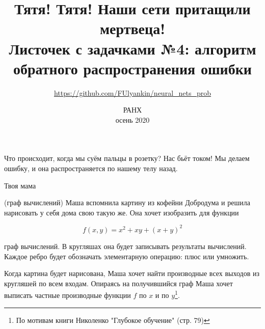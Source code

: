 \documentclass[12pt, a4paper, oneside]{article}
\title{%
	Тятя! Тятя! Наши сети притащили мертвеца! \\
	\large Листочек с задачками №4: алгоритм обратного распространения ошибки
}
\date{РАНХ \\ осень 2020}
\author{\url{https://github.com/FUlyankin/neural_nets_prob} }
\theoremstyle{plain} %
\theoremstyle{definition}
\begin{document}
	
	\maketitle


\epigraph{Что происходит, когда мы суём пальцы в розетку? Нас бьёт током! Мы делаем ошибку, и она распространяется по нашему телу назад.}{Твоя мама}


\begin{problem}{(граф вычислений)}
	Маша вспомнила картину из кофейни Добродума и решила нарисовать у себя дома свою такую же. Она хочет изобразить для функции  
	
	$$
	f(x,y) = x^2 + xy + (x + y)^2
	$$ 
	
	граф вычислений. В кругляшах она будет записывать результаты вычислений. Каждое ребро будет обозначать элементарную операцию: плюс или умножить.
	
	Когда картина будет нарисована, Маша хочет найти производные всех выходов из кругляшей по всем входам. Опираясь на получившийся граф Маша хочет выписать частные производные функции $f$ по $x$ и по $y$\footnote{По мотивам книги Николенко "Глубокое обучение" (стр. 79)}.
\end{problem} 
\end{document}
